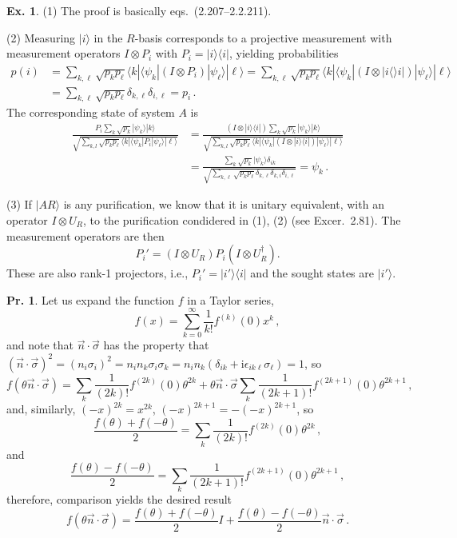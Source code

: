 \documentclass[a4paper,12pt]{article}
\def\imagi{\mathrm{i}}
\theoremstyle{definition}
\newtheorem{exercise}{Ex.}[section]
\newtheorem{problem}{Pr.}[section]
\begin{document}
\begin{exercise}
 (1) The proof is basically eqs.\ (2.207--2.2.211).
 
 (2) Measuring $|i\rangle$ in the $R$-basis corresponds to a projective measurement with measurement operators $I\otimes P_i$ with $P_i = |i\rangle\langle i|$, yielding probabilities
 \[
  \begin{aligned}
   p(i) &= \sum_{k,\ell} \sqrt{p_kp_\ell}\langle k | \langle \psi_k | (I\otimes P_i) | \psi_\ell \rangle |\ell\rangle = \sum_{k,\ell} \sqrt{p_kp_\ell}\langle k | \langle \psi_k | (I\otimes |i\langle\rangle i|) | \psi_\ell \rangle |\ell\rangle\\ &= \sum_{k,\ell}\sqrt{p_kp_\ell}\delta_{k,\ell}\delta_{i,\ell} = p_i\,.
  \end{aligned}
 \]
 The corresponding state of system $A$ is
 \[
  \begin{aligned}
   \frac{P_i \sum_k \sqrt{p_k}|\psi_k\rangle|k\rangle}{\sqrt{\sum_{k,l}\sqrt{p_kp_\ell}\langle k|\langle \psi_k|P_i|\psi_\ell\rangle|\ell\rangle}} &= \frac{(I\otimes |i\rangle\langle i|) \sum_k \sqrt{p_k}|\psi_k\rangle|k\rangle}{\sqrt{\sum_{k,l}\sqrt{p_kp_\ell}\langle k|\langle \psi_k|(I\otimes|i\rangle\langle i|)|\psi_\ell\rangle|\ell\rangle}}\\
   &= \frac{\sum_k \sqrt{p_k}|\psi_k\rangle\delta_{ik}}{\sqrt{\sum_{k,\ell} \sqrt{p_kp_\ell}\delta_{k,\ell}\delta_{k,i}\delta_{i,\ell}}} = \psi_k\,.
  \end{aligned}
 \]

 (3) If $|AR\rangle$ is any purification, we know that it is unitary equivalent, with an operator $I\otimes U_R$, to the purification condidered in (1), (2) (see Excer.\ 2.81). The measurement operators are then
 \[
  P_i' = (I\otimes U_R) P_i (I\otimes U_R^\dagger).
 \]
 These are also rank-1 projectors, i.e., $P_i' = |i'\rangle\langle i|$ and the sought states are $|i'\rangle$.

\end{exercise}

\begin{problem}
 Let us expand the function $f$ in a Taylor series,
 \[
  f(x) = \sum_{k=0}^\infty \frac{1}{k!}f^{(k)}(0)x^k\,,
 \]
 and note that $\vec{n}\cdot\vec{\sigma}$ has the property that $(\vec{n}\cdot\vec{\sigma})^2 = (n_i\sigma_i)^2 = n_i n_k \sigma_i \sigma_k = n_i n_k (\delta_{ik} + \imagi \epsilon_{ik\ell}\sigma_\ell) = 1$, so
 \[
  f(\theta\vec{n}\cdot\vec{\sigma}) = \sum_k \frac{1}{(2k)!}f^{(2k)}(0)\theta^{2k} + \theta \vec{n}\cdot\vec{\sigma}\sum_k \frac{1}{(2k+1)!}f^{(2k+1)}(0) \theta^{2k+1}\,,
 \]
 and, similarly, $(-x)^{2k} = x^{2k}$, $(-x)^{2k+1} = -(-x)^{2k+1}$, so
 \[
  \frac{f(\theta) + f(-\theta)}2 = \sum_k \frac{1}{(2k)!}f^{(2k)}(0) \theta^{2k}\,,
 \]
 and
 \[
  \frac{f(\theta) - f(-\theta)}2 = \sum_k \frac{1}{(2k+1)!}f^{(2k+1)}(0) \theta^{2k+1}\,,
 \]
 therefore, comparison yields the desired result
 \[
  f(\theta\vec{n}\cdot\vec{\sigma}) = \frac{f(\theta)+f(-\theta)}{2}I + \frac{f(\theta)-f(-\theta)}{2}\vec{n}\cdot\vec{\sigma}\,.
 \]
\end{problem}
\end{document}
